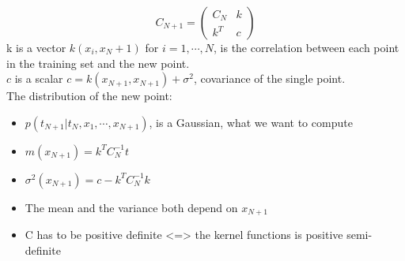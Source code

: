     $$
    C_{N+1}=
    \begin{pmatrix}
        C_N & k \\
        k^T & c
    \end{pmatrix}
    $$
    k is a vector $k(x_i,x_N+1)$ for $i=1,\cdots,N$, is the correlation between each point in the training set and the new point.\\
    $c$ is a scalar $c=k(x_{N+1},x_{N+1})+\sigma^2$, covariance of the single point.\\
    The distribution of the new point:
    \begin{itemize}
        \item $p(t_{N+1}|t_N,x_1,\cdots,x_{N+1})$, is a Gaussian, what we want to compute
        \item $m(x_{N+1})=k^TC^{-1}_Nt$
        \item $\sigma^2(x_{N+1})=c-k^TC^{-1}_Nk$
        \item The mean and the variance both depend on $x_{N+1}$
        \item C has to be positive definite <=> the kernel functions is positive semi-definite
    \end{itemize}

